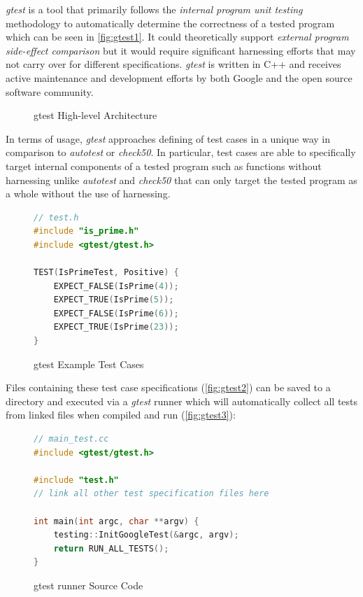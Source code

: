 \documentclass[hidelinks]{report}
\begin{document}
\textit{gtest} is a tool that primarily follows the \textit{internal program unit testing} methodology to automatically determine the correctness of a tested program which can be seen in \autoref{fig:gtest1}. It could theoretically support \textit{external program side-effect comparison} but it would require significant harnessing efforts that may not carry over for different specifications. \textit{gtest} is written in C++ and receives active maintenance and development efforts by both Google and the open source software community.

\begin{figure}[h]
	\centering
	\caption{gtest High-level Architecture}
	\label{fig:gtest1}
\end{figure}

In terms of usage, \textit{gtest} approaches defining of test cases in a unique way in comparison to \textit{autotest} or \textit{check50}. In particular, test cases are able to specifically target internal components of a tested program such as functions without harnessing unlike \textit{autotest} and \textit{check50} that can only target the tested program as a whole without the use of harnessing.

\begin{figure}[h]
	\centering
	\begin{lstlisting}[language=c++, breaklines=true, linewidth=\linewidth]
// test.h
#include "is_prime.h"
#include <gtest/gtest.h>

TEST(IsPrimeTest, Positive) {
	EXPECT_FALSE(IsPrime(4));
	EXPECT_TRUE(IsPrime(5));
	EXPECT_FALSE(IsPrime(6));
	EXPECT_TRUE(IsPrime(23));
}
	\end{lstlisting}
	\caption{gtest Example Test Cases}
	\label{fig:gtest2}
\end{figure}

Files containing these test case specifications (\autoref{fig:gtest2}) can be saved to a directory and executed via a \textit{gtest} runner which will automatically collect all tests from linked files when compiled and run (\autoref{fig:gtest3}):

\begin{figure}[h]
	\centering
	\begin{lstlisting}[language=c++, breaklines=true, linewidth=\linewidth]
// main_test.cc
#include <gtest/gtest.h>

#include "test.h"
// link all other test specification files here

int main(int argc, char **argv) {
	testing::InitGoogleTest(&argc, argv);
	return RUN_ALL_TESTS();
}
	\end{lstlisting}
	\caption{gtest runner Source Code}
	\label{fig:gtest3}
\end{figure}
\end{document}
